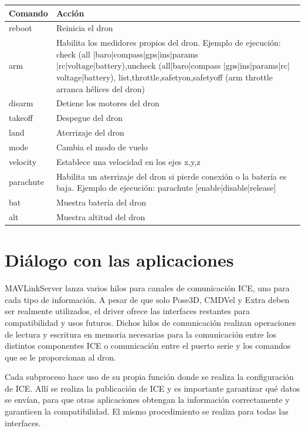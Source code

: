 \begin{center}
  \label{comandos}
  \begin{tabular}{ | l | p{10cm} |}
  \hline
  Comando & Acción \\ \hline
  reboot& Reinicia el dron\\ \hline
  arm & Habilita los medidores propios del dron. Ejemplo de ejecución: check (all |baro|compass|gps|ins|params |rc|voltage|battery),uncheck (all|baro|compass |gps|ins|params|rc| voltage|battery), list,throttle,safetyon,safetyoff (arm throttle arranca hélices del dron)\\ \hline
  disarm& Detiene los motores del dron \\ \hline
  takeoff& Despegue del dron\\ \hline
  land&Aterrizaje del dron \\ \hline
  mode& Cambia el modo de vuelo\\ \hline
  velocity& Establece una velocidad en los ejes x,y,z\\ \hline
  parachute& Habilita un aterrizaje del dron si pierde conexión o la batería es baja. Ejemplo de ejecución: parachute [enable|disable|release]\\ \hline
  bat& Muestra batería del dron\\ \hline
  alt& Muestra altitud del dron\\ \hline
    \hline
  \end{tabular}
\end{center}
\section{Diálogo con las aplicaciones}


MAVLinkServer lanza varios hilos para canales de comunicación ICE, uno para cada tipo de información. A pesar de que solo Pose3D, CMDVel y Extra deben ser realmente utilizados, el driver ofrece las interfaces restantes para compatibilidad y usos futuros. Dichos hilos de comunicación realizan operaciones de lectura y escritura en memoria necesarias para la comunicación entre los distintos componentes ICE o comunicación entre el puerto serie y los comandos que se le proporcionan al dron.

Cada subproceso hace uso de su propia función donde se realiza la configuración de ICE.
Allí se realiza la publicación de ICE y es importante garantizar qué datos se envían, para que otras aplicaciones obtengan la información correctamente y garanticen la compatibilidad.
El mismo procedimiento se realiza para todas las interfaces.

